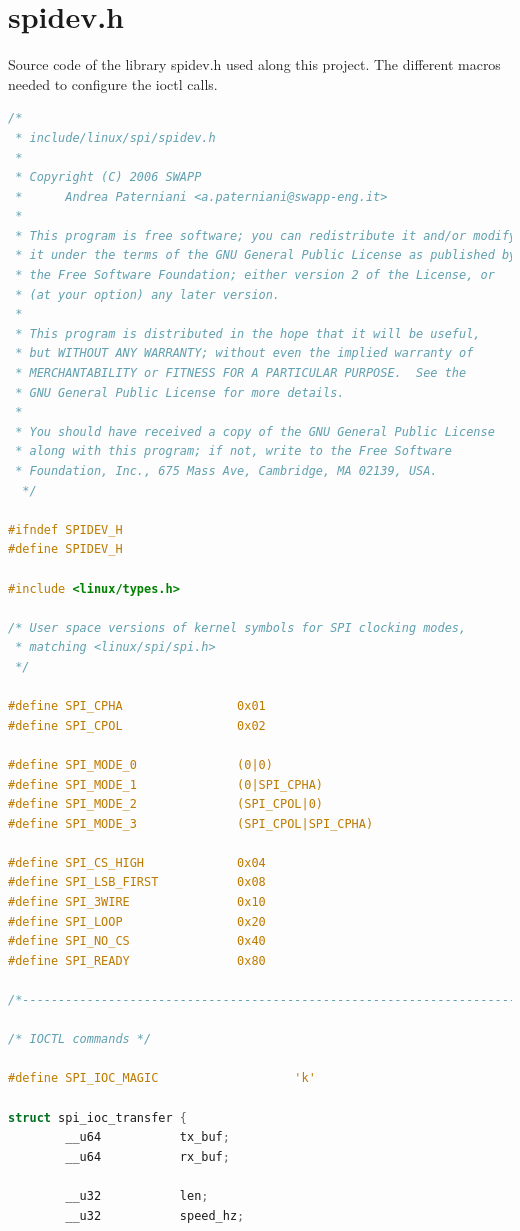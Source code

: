 \section{spidev.h}\label{S:linux-spi-spidev}
Source code of the library spidev.h used along this project. The different macros needed to configure the ioctl calls.
\begin{lstlisting}[language=C, caption={linux/spi/spidev.h}]
/*
 * include/linux/spi/spidev.h
 *
 * Copyright (C) 2006 SWAPP
 *      Andrea Paterniani <a.paterniani@swapp-eng.it>
 *
 * This program is free software; you can redistribute it and/or modify
 * it under the terms of the GNU General Public License as published by
 * the Free Software Foundation; either version 2 of the License, or
 * (at your option) any later version.
 *
 * This program is distributed in the hope that it will be useful,
 * but WITHOUT ANY WARRANTY; without even the implied warranty of
 * MERCHANTABILITY or FITNESS FOR A PARTICULAR PURPOSE.  See the
 * GNU General Public License for more details.
 *
 * You should have received a copy of the GNU General Public License
 * along with this program; if not, write to the Free Software
 * Foundation, Inc., 675 Mass Ave, Cambridge, MA 02139, USA.
  */

#ifndef SPIDEV_H
#define SPIDEV_H

#include <linux/types.h>

/* User space versions of kernel symbols for SPI clocking modes,
 * matching <linux/spi/spi.h>
 */

#define SPI_CPHA                0x01
#define SPI_CPOL                0x02

#define SPI_MODE_0              (0|0)
#define SPI_MODE_1              (0|SPI_CPHA)
#define SPI_MODE_2              (SPI_CPOL|0)
#define SPI_MODE_3              (SPI_CPOL|SPI_CPHA)

#define SPI_CS_HIGH             0x04
#define SPI_LSB_FIRST           0x08
#define SPI_3WIRE               0x10
#define SPI_LOOP                0x20
#define SPI_NO_CS               0x40
#define SPI_READY               0x80

/*---------------------------------------------------------------------------*/

/* IOCTL commands */

#define SPI_IOC_MAGIC                   'k'

struct spi_ioc_transfer {
        __u64           tx_buf;
        __u64           rx_buf;

        __u32           len;
        __u32           speed_hz;


\end{lstlisting}
